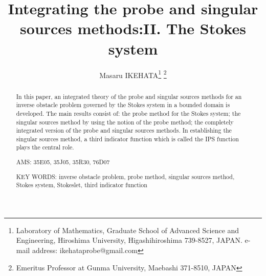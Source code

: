 \setlength{\topmargin}{-45pt}
\setlength{\oddsidemargin}{0cm}
\setlength{\evensidemargin}{0cm}
\setlength{\textheight}{23.7cm}
\setlength{\textwidth}{16cm}
\setlength{\headheight}{12truept}
\setlength{\headsep}{25pt}
\setlength{\footskip}{37pt}
\setlength{\footheight}{12pt}
\setlength{\hoffset}{0pt}
\setlength{\voffset}{12pt}
\def\Bbb R{{\rm \bf R}}
\def\proclaim#1{\vskip2mm{\bf #1}\em}
\def\endproclaim{\em \vskip2mm}
\def\tag#1{\eqno(#1)}
\def\gathered{\begin{array}{c}}
\def\endgathered{\end{array}}
\def\text{\mbox}



\title {Integrating the probe and singular sources methods:II.  The Stokes system}
\author{Masaru IKEHATA\footnote{
Laboratory of Mathematics,
Graduate School of Advanced Science and Engineering,
Hiroshima University,
Higashihiroshima 739-8527, JAPAN.
e-mail address: ikehataprobe@gmail.com}
\footnote{Emeritus Professor at Gunma University, Maebashi 371-8510, JAPAN}
}
\maketitle

\begin{abstract}
In this paper, an integrated theory of the probe and singular sources methods
for an inverse obstacle problem governed by the Stokes system in a bounded domain is developed.
The main results consist of:
the probe method for the Stokes system;
the singular sources method by using the notion of the probe method;
the completely integrated version of the probe and singular sources methods.
In establishing the singular sources method, a third indicator function which is called
the IPS function plays the central role.




















\noindent
AMS: 35E05, 35J05, 35R30, 76D07 

\noindent KEY WORDS: inverse obstacle problem, probe method, singular sources method, Stokes system, Stokeslet,
third indicator function
\end{abstract}





